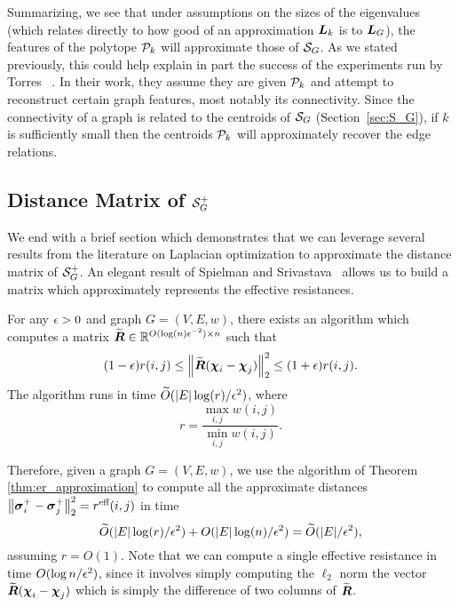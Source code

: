 Summarizing, we see  that under assumptions on the sizes of the eigenvalues (which relates  directly to  how good of an approximation $\L_k$ is to $\L_G$), the features of the  polytope $\P_k$  will  approximate  those of $\splx_G$. As we stated previously, this could help explain in part the success of the experiments run by Torres \etal~\cite{torres2019geometric}.  In their work, they assume they are given  $\P_k$ and  attempt to reconstruct certain  graph  features,  most notably its connectivity.  Since  the connectivity of  a  graph  is related to  the centroids of $\splx_G$ (Section~\ref{sec:S_G}), if $k$ is sufficiently small then  the centroids $\P_k$ will approximately  recover the edge relations. 




\subsection{Distance Matrix of \texorpdfstring{$\splx_G^+$}{the inverse combinatorial simplex}}
\label{sec:algorithmics_distance_matrix}
We end with  a brief section which demonstrates that we can leverage several results from the literature on Laplacian optimization to approximate the  distance matrix  of $\splx_G^+$. 
An elegant result of Spielman and Srivastava~\cite{spielman2011graph} allows us to  build a matrix which approximately  represents the effective resistances.  


\begin{theorem}
	\label{thm:er_approximation}
	For any $\eps>0$ and graph $G=(V,E,w)$, there exists an algorithm which computes a matrix $\widetilde{\Reff}\in\R^{O(\log(n)\eps^{-2})\times n}$ such that 
	\begin{equation*}
	(1-\eps)r(i,j) \leq \norm{\widetilde{\Reff}(\bchi_i-\bchi_j)}_2^2 \leq (1+\eps) r(i,j).
	\end{equation*}
	The algorithm runs in time $\widetilde{O}( |E|\log (r)/\eps^2)$, where 
	\[r=\frac{\max_{i,j}w(i,j)}{\min_{i,j}w(i,j)}.\]
\end{theorem}


Therefore, given a graph $G=(V,E,w)$, we use the algorithm of Theorem \ref{thm:er_approximation} to compute all the approximate distances $\norm{\sv_i^+-\sv_j^+}_2^2=\effr(i,j)$ in time \[\widetilde{O}(|E|\log (r)/\eps^2)+O(|E| \log(n)/\eps^2)=\widetilde{O}(|E|/\eps^2),\]
assuming $r=O(1)$. Note that we can compute a single effective resistance in time $O(\log n/\eps^2)$, since it involves simply computing the $\ell_2$ norm the vector $\widetilde{\Reff}(\bchi_i-\bchi_j)$ which is simply the difference of two columns of $\widetilde{\Reff}$. 

